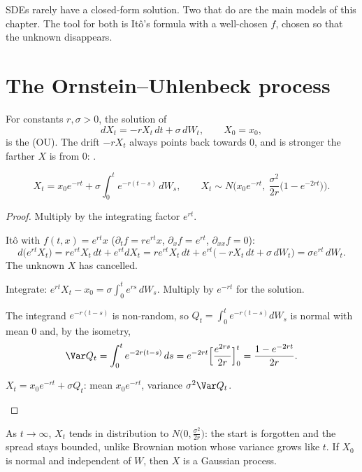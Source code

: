 SDEs rarely have a closed-form solution. Two that do are the main models of this chapter. The tool for both is Itô's formula with a well-chosen $f$, chosen so that the unknown disappears.

\section{The Ornstein--Uhlenbeck process}

\begin{definition}
For constants $r,\sigma>0$, the solution of
\[
  dX_t=-rX_t\,dt+\sigma\,dW_t,\qquad X_0=x_0,
\]
is the  (OU). The drift $-rX_t$ always points back towards $0$, and is stronger the farther $X$ is from $0$: .
\end{definition}

\begin{theorem}
\label{thm:ou}
\[
  X_t=x_0e^{-rt}+\sigma\int_0^te^{-r(t-s)}\,dW_s,
  \qquad
  X_t\sim N\Big(x_0e^{-rt},\ \frac{\sigma^2}{2r}\big(1-e^{-2rt}\big)\Big).
\]
\end{theorem}
\begin{proof}
Multiply by the integrating factor $e^{rt}$.
\begin{steps}
  \item Itô with $f(t,x)=e^{rt}x$ ($\partial_tf=re^{rt}x$, $\partial_xf=e^{rt}$, $\partial_{xx}f=0$):
  \[
    d\big(e^{rt}X_t\big)=re^{rt}X_t\,dt+e^{rt}dX_t=re^{rt}X_t\,dt+e^{rt}\big(-rX_t\,dt+\sigma\,dW_t\big)=\sigma e^{rt}\,dW_t .
  \]
  The unknown $X$ has cancelled.
  \item Integrate: $e^{rt}X_t-x_0=\sigma\int_0^te^{rs}\,dW_s$. Multiply by $e^{-rt}$ for the solution.
  \item The integrand $e^{-r(t-s)}$ is non-random, so $Q_t=\int_0^te^{-r(t-s)}dW_s$ is normal with mean $0$ and, by the isometry,
  \[
    \Var Q_t=\int_0^te^{-2r(t-s)}\,ds=e^{-2rt}\Big[\frac{e^{2rs}}{2r}\Big]_0^t=\frac{1-e^{-2rt}}{2r}.
  \]
  \item $X_t=x_0e^{-rt}+\sigma Q_t$: mean $x_0e^{-rt}$, variance $\sigma^2\Var Q_t$. \qedhere
\end{steps}
\end{proof}

As $t\to\infty$, $X_t$ tends in distribution to $N\big(0,\frac{\sigma^2}{2r}\big)$: the start is forgotten and the spread stays bounded, unlike Brownian motion whose variance grows like $t$. If $X_0$ is normal and independent of $W$, then $X$ is a Gaussian process.

